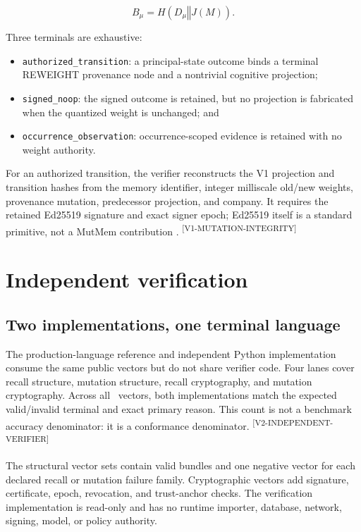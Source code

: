\documentclass[10pt]{article}
\newcommand{\concat}{\mathbin\Vert}
\newcommand{\evidence}[1]{\textsuperscript{\scriptsize\textsf{[#1]}}}
\begin{document}
\begin{equation}
B_\mu = H(D_\mu\concat J(M)).
\label{eq:mutation-bundle}
\end{equation}

Three terminals are exhaustive:

\begin{itemize}
  \item \texttt{authorized\_transition}: a principal-state outcome binds a
  terminal REWEIGHT provenance node and a nontrivial cognitive projection;
  \item \texttt{signed\_noop}: the signed outcome is retained, but no projection
  is fabricated when the quantized weight is unchanged; and
  \item \texttt{occurrence\_observation}: occurrence-scoped evidence is retained
  with no weight authority.
\end{itemize}

For an authorized transition, the verifier reconstructs the V1 projection and
transition hashes from the memory identifier, integer milliscale old/new
weights, provenance mutation, predecessor projection, and company. It requires
the retained Ed25519 signature and exact signer epoch; Ed25519 itself is a
standard primitive, not a MutMem contribution \cite{rfc8032}.
\evidence{V1-MUTATION-INTEGRITY}

\section{Independent verification}

\subsection{Two implementations, one terminal language}

The production-language reference and independent Python implementation consume
the same public vectors but do not share verifier code. Four lanes cover recall
structure, mutation structure, recall cryptography, and mutation cryptography.
Across all \MutMemCrossLanguageTerminalCount\ vectors, both implementations
match the expected valid/invalid terminal and exact primary reason. This count is
not a benchmark accuracy denominator: it is a conformance denominator.
\evidence{V2-INDEPENDENT-VERIFIER}

The structural vector sets contain valid bundles and one negative vector for
each declared recall or mutation failure family. Cryptographic vectors add
signature, certificate, epoch, revocation, and trust-anchor checks. The
verification implementation is read-only and has no runtime importer, database,
network, signing, model, or policy authority.
\end{document}
